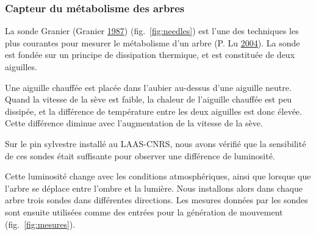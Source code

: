 \documentclass[french,A4paper,]{book}
\begin{document}
\subsubsection{Capteur du métabolisme des
arbres}\label{capteur-du-muxe9tabolisme-des-arbres}

La sonde Granier (Granier \protect\hyperlink{ref-granier}{1987})
(fig.~\ref{fig:needles}) est l'une des techniques les plus courantes
pour mesurer le métabolisme d'un arbre (P. Lu
\protect\hyperlink{ref-lu2004}{2004}). La sonde est fondée sur un
principe de dissipation thermique, et est constituée de deux aiguilles.

Une aiguille chauffée est placée dans l'aubier au-dessus d'une aiguille
neutre. Quand la vitesse de la sève est faible, la chaleur de l'aiguille
chauffée est peu dissipée, et la différence de température entre les
deux aiguilles est donc élevée. Cette différence diminue avec
l'augmentation de la vitesse de la sève.

Sur le pin sylvestre installé au LAAS-CNRS, nous avons vérifié que la
sensibilité de ces sondes était suffisante pour observer une différence
de luminosité.

Cette luminosité change avec les conditions atmosphériques, ainsi que
lorsque que l'arbre se déplace entre l'ombre et la lumière. Nous
installons alors dans chaque arbre trois sondes dans différentes
directions. Les mesures données par les sondes sont ensuite utilisées
comme des entrées pour la génération de mouvement
(fig.~\ref{fig:mesures}).
\end{document}
